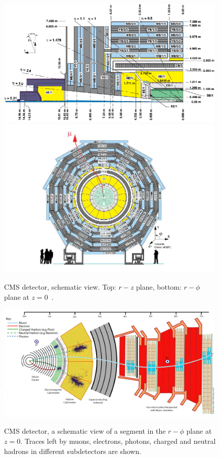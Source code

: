 \begin{figure}[htb]
  \begin{center}
    {\includegraphics[width=0.98\textwidth]{../figs/Exp/CMSview1.png}\\
     \includegraphics[width=0.98\textwidth]{../figs/Exp/CMSview.png}}
    \caption{CMS detector, schematic view. Top: $r-z$ plane, bottom: $r-\phi$ plane at $z=0$~\cite{ref_CMSschemView}. }
    \label{fig:CMSschemView}
  \end{center}
\end{figure}


\begin{figure}[htb]
  \begin{center}
    {\includegraphics[width=0.98\textwidth]{../figs/Exp/CMS_Slice.png}}
    \caption{CMS detector, a schematic view of a segment in the $r-\phi$ plane at $z=0$. Traces left by muons, electrons, photons, charged and neutral hadrons in different subdetectors are shown.}
    \label{fig:CMS_slice}
  \end{center}
\end{figure}

